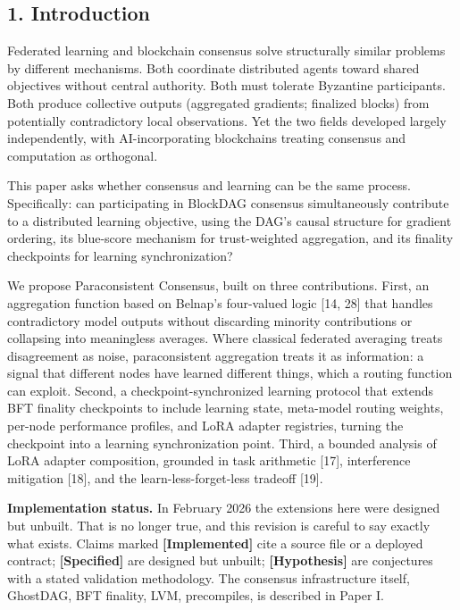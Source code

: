 \subsection{1. Introduction}\label{introduction}

Federated learning and blockchain consensus solve structurally similar
problems by different mechanisms. Both coordinate distributed agents
toward shared objectives without central authority. Both must tolerate
Byzantine participants. Both produce collective outputs (aggregated
gradients; finalized blocks) from potentially contradictory local
observations. Yet the two fields developed largely independently, with
AI-incorporating blockchains treating consensus and computation as
orthogonal.

This paper asks whether consensus and learning can be the same process.
Specifically: can participating in BlockDAG consensus simultaneously
contribute to a distributed learning objective, using the DAG's causal
structure for gradient ordering, its blue-score mechanism for
trust-weighted aggregation, and its finality checkpoints for learning
synchronization?

We propose Paraconsistent Consensus, built on three contributions.
First, an aggregation function based on Belnap's four-valued logic
{[}14, 28{]} that handles contradictory model outputs without discarding
minority contributions or collapsing into meaningless averages. Where
classical federated averaging treats disagreement as noise,
paraconsistent aggregation treats it as information: a signal that
different nodes have learned different things, which a routing function
can exploit. Second, a checkpoint-synchronized learning protocol that
extends BFT finality checkpoints to include learning state, meta-model
routing weights, per-node performance profiles, and LoRA adapter
registries, turning the checkpoint into a learning synchronization
point. Third, a bounded analysis of LoRA adapter composition, grounded
in task arithmetic {[}17{]}, interference mitigation {[}18{]}, and the
learn-less-forget-less tradeoff {[}19{]}.

\textbf{Implementation status.} In February 2026 the extensions here
were designed but unbuilt. That is no longer true, and this revision is
careful to say exactly what exists. Claims marked
\textbf{{[}Implemented{]}} cite a source file or a deployed contract;
\textbf{{[}Specified{]}} are designed but unbuilt;
\textbf{{[}Hypothesis{]}} are conjectures with a stated validation
methodology. The consensus infrastructure itself, GhostDAG, BFT
finality, LVM, precompiles, is described in Paper I.


